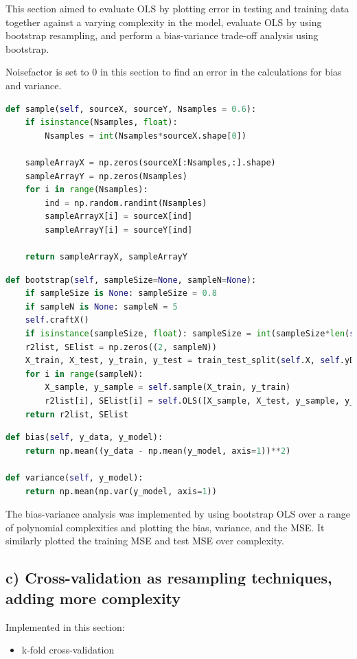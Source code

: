 \documentclass[a4paper, UKenglish]{article}
\newcommand{\0}{\mathbf{0}}
\newcommand{\1}{\mathbf{1}}
\begin{document}
This section aimed to evaluate OLS by plotting error in testing and training data together against a varying complexity in the model, evaluate OLS by using bootstrap resampling, and perform a bias-variance trade-off analysis using bootstrap.

Noisefactor is set to 0 in this section to find an error in the calculations for bias and variance.

\begin{lstlisting}[language=python]
def sample(self, sourceX, sourceY, Nsamples = 0.6):
    if isinstance(Nsamples, float):
        Nsamples = int(Nsamples*sourceX.shape[0])

    sampleArrayX = np.zeros(sourceX[:Nsamples,:].shape)
    sampleArrayY = np.zeros(Nsamples)
    for i in range(Nsamples):
        ind = np.random.randint(Nsamples)
        sampleArrayX[i] = sourceX[ind]
        sampleArrayY[i] = sourceY[ind]

    return sampleArrayX, sampleArrayY
\end{lstlisting}

\begin{lstlisting}[language=python]
def bootstrap(self, sampleSize=None, sampleN=None):
    if sampleSize is None: sampleSize = 0.8
    if sampleN is None: sampleN = 5
    self.craftX()
    if isinstance(sampleSize, float): sampleSize = int(sampleSize*len(self.x))
    r2list, SElist = np.zeros((2, sampleN)) 
    X_train, X_test, y_train, y_test = train_test_split(self.X, self.yData)
    for i in range(sampleN):
        X_sample, y_sample = self.sample(X_train, y_train)
        r2list[i], SElist[i] = self.OLS([X_sample, X_test, y_sample, y_test])[:2]
    return r2list, SElist
\end{lstlisting}

\begin{lstlisting}[language=python]
def bias(self, y_data, y_model):
    return np.mean((y_data - np.mean(y_model, axis=1))**2)
    
def variance(self, y_model):
    return np.mean(np.var(y_model, axis=1))
\end{lstlisting}

The bias-variance analysis was implemented by using bootstrap OLS over a range of polynomial complexities and plotting the bias, variance, and the MSE. It similarly plotted the training MSE and test MSE over complexity.

\subsection{c) Cross-validation as resampling techniques, adding more complexity}
Implemented in this section: 
\begin{itemize}
\item k-fold cross-validation
\end{itemize}
\end{document}

